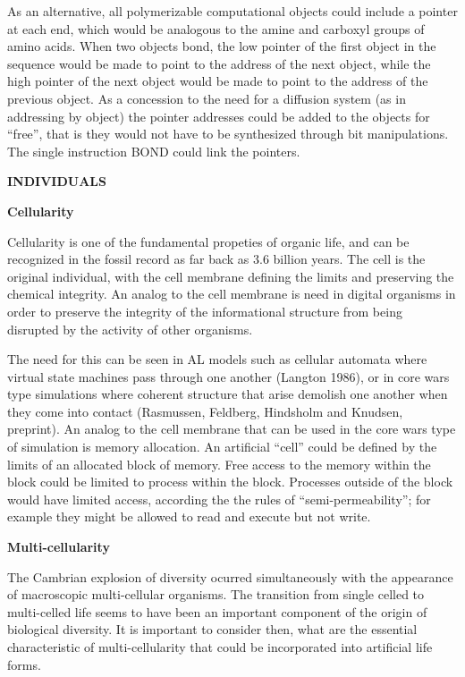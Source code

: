 As an alternative, all polymerizable computational objects could include a
pointer at each end, which would be analogous to the amine and carboxyl
groups of amino acids.  When two objects bond, the low pointer of the first
object in the sequence would be made to point to the address of the next
object, while the high pointer of the next object would be made to point
to the address of the previous object.  As a concession to the need for
a diffusion system (as in addressing by object) the pointer addresses
could be added to the objects for ``free'', that is they would not have to
be synthesized through bit manipulations.  The single instruction BOND
could link the pointers.

\LP
\bf INDIVIDUALS\rm
\eLP

\LP
\bf Cellularity\rm
\eLP

Cellularity is one of the fundamental propeties of organic life, and can
be recognized in the fossil record as far back as 3.6 billion years.  The
cell is the original individual, with the cell membrane defining the limits
and preserving the chemical integrity.  An analog to the cell membrane is
need in digital organisms in order to preserve the integrity of the
informational structure from being disrupted by the activity of other
organisms.

The need for this can be seen in AL models such as cellular automata where
virtual state machines pass through one another (Langton 1986), or in core
wars type simulations where coherent structure that arise demolish one
another when they come into contact (Rasmussen, Feldberg, Hindsholm and
Knudsen, preprint).  An analog to the
cell membrane that can be used in the core wars type of simulation is
memory allocation.  An artificial ``cell'' could be defined by the limits
of an allocated block of memory.  Free access to the memory within the
block could be limited to process within the block.  Processes outside
of the block would have limited access, according the the rules of
``semi-permeability''; for example they might be allowed to read and
execute but not write.

\LP
\bf Multi-cellularity\rm
\eLP

The Cambrian explosion of diversity ocurred simultaneously with the
appearance of macroscopic multi-cellular organisms.  The transition from
single celled to multi-celled life seems to have been an important
component of the origin of biological diversity.  It is important to
consider then, what are the essential characteristic of multi-cellularity
that could be incorporated into artificial life forms.

